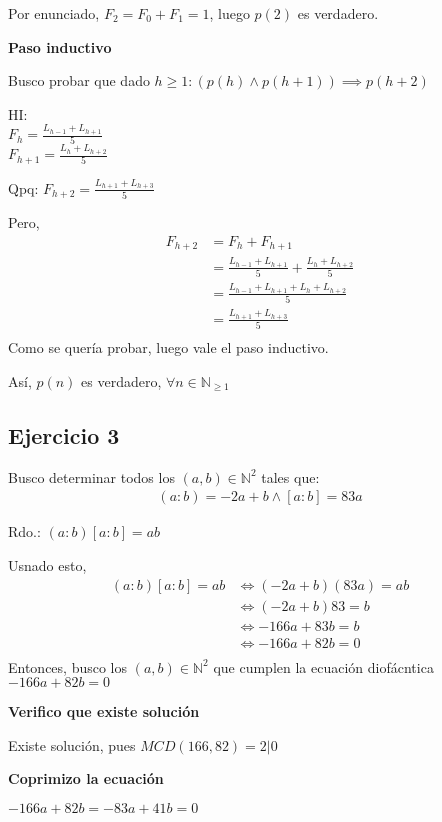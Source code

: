 Por enunciado, $ F_2 = F_0 + F_1 = 1 $, luego $ p(2) $ es verdadero.

\textbf{Paso inductivo}

Busco probar que dado $h \geq 1: (p(h) \wedge p(h+1)) \implies p(h+2) $

HI: \\ 
$ F_h = \frac{L_{h-1} + L_{h+1}}{5} $ \\
$ F_{h+1} = \frac{L_{h} + L_{h+2}}{5} $ 

Qpq: $ F_{h+2} = \frac{L_{h+1} + L_{h+3}}{5} $

Pero,
\begin{align*}
    F_{h+2} &= F_h + F_{h+1} \\
    &= \frac{L_{h-1} + L_{h+1}}{5} + \frac{L_{h} + L_{h+2}}{5} \\
    &= \frac{L_{h-1} + L_{h+1} + L_{h} + L_{h+2}}{5} \\
    &= \frac{L_{h+1} + L_{h+3}}{5} \\
\end{align*}
Como se quería probar, luego vale el paso inductivo.

Así, $ p(n) $ es verdadero, $ \forall n \in \mathbb{N}_{\geq 1} $

\subsection{Ejercicio 3}

Busco determinar todos los $ (a,b) \in \mathbb{N}^2 $ tales que:
\begin{align*}
    (a:b) = -2a+b \wedge [a:b] = 83a
\end{align*}

Rdo.: $ (a:b)[a:b] = ab $

Usnado esto,
\begin{align*}
    (a:b)[a:b] = ab &\iff (-2a+b)(83a) = ab \\
    &\iff (-2a+b)83 = b \\
    &\iff -166a + 83b = b \\
    &\iff -166a + 82b = 0 \\
\end{align*}
Entonces, busco los $ (a,b) \in \mathbb{N}^2 $ que cumplen la ecuación diofácntica $ -166a + 82b = 0 $

\textbf{Verifico que existe solución}

Existe solución, pues $ MCD(166, 82) = 2|0 $

\textbf{Coprimizo la ecuación}

$ -166a+82b = -83a + 41b = 0 $

